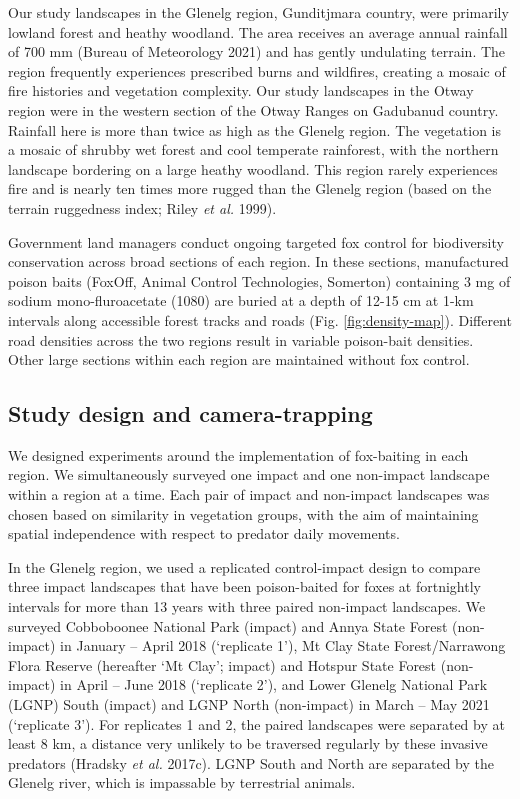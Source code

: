 \documentclass[11pt,a4paper,titlepage,twoside,openright]{style/unimelbthesis}
\begin{document}
\begin{mainmatter}
Our study landscapes in the Glenelg region, Gunditjmara country, were primarily lowland forest and heathy woodland. The area receives an average annual rainfall of 700 mm (Bureau of Meteorology 2021) and has gently undulating terrain. The region frequently experiences prescribed burns and wildfires, creating a mosaic of fire histories and vegetation complexity. Our study landscapes in the Otway region were in the western section of the Otway Ranges on Gadubanud country. Rainfall here is more than twice as high as the Glenelg region. The vegetation is a mosaic of shrubby wet forest and cool temperate rainforest, with the northern landscape bordering on a large heathy woodland. This region rarely experiences fire and is nearly ten times more rugged than the Glenelg region (based on the terrain ruggedness index; Riley \emph{et al.} 1999).

Government land managers conduct ongoing targeted fox control for biodiversity conservation across broad sections of each region. In these sections, manufactured poison baits (FoxOff, Animal Control Technologies, Somerton) containing 3 mg of sodium mono-fluroacetate (1080) are buried at a depth of 12-15 cm at 1-km intervals along accessible forest tracks and roads (Fig. \ref{fig:density-map}). Different road densities across the two regions result in variable poison-bait densities. Other large sections within each region are maintained without fox control.

\hypertarget{study-design-and-camera-trapping}{%
\subsection{Study design and camera-trapping}\label{study-design-and-camera-trapping}}

We designed experiments around the implementation of fox-baiting in each region. We simultaneously surveyed one impact and one non-impact landscape within a region at a time. Each pair of impact and non-impact landscapes was chosen based on similarity in vegetation groups, with the aim of maintaining spatial independence with respect to predator daily movements.

In the Glenelg region, we used a replicated control-impact design to compare three impact landscapes that have been poison-baited for foxes at fortnightly intervals for more than 13 years with three paired non-impact landscapes. We surveyed Cobboboonee National Park (impact) and Annya State Forest (non-impact) in January -- April 2018 (`replicate 1'), Mt Clay State Forest/Narrawong Flora Reserve (hereafter `Mt Clay'; impact) and Hotspur State Forest (non-impact) in April -- June 2018 (`replicate 2'), and Lower Glenelg National Park (LGNP) South (impact) and LGNP North (non-impact) in March -- May 2021 (`replicate 3'). For replicates 1 and 2, the paired landscapes were separated by at least 8 km, a distance very unlikely to be traversed regularly by these invasive predators (Hradsky \emph{et al.} 2017c). LGNP South and North are separated by the Glenelg river, which is impassable by terrestrial animals.


\end{mainmatter}
\end{document}
